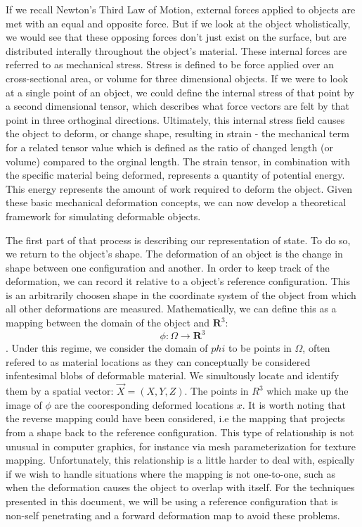 \documentclass[12pt,oneside,letterpaper]{memoir}
\begin{document}
If we recall Newton's Third Law of Motion, external forces applied to
objects are met with an equal and opposite force. But if we look at
the object wholistically, we would see that these opposing forces
don't just exist on the surface, but are distributed interally
throughout the object's material. These internal forces are referred
to as mechanical stress. Stress is defined to be force applied over an
cross-sectional area, or volume for three dimensional objects. If we
were to look at a single point of an object, we could define the
internal stress of that point by a second dimensional tensor, which
describes what force vectors are felt by that point in three
orthoginal directions. Ultimately, this internal stress field causes
the object to deform, or change shape, resulting in strain - the
mechanical term for a related tensor value which is defined as the
ratio of changed length (or volume) compared to the orginal
length. The strain tensor, in combination with the specific material
being deformed, represents a quantity of potential energy. This energy
represents the amount of work required to deform the object.  Given
these basic mechanical deformation concepts, we can now develop a
theoretical framework for simulating deformable objects.

The first part of that process is describing our representation of
state. To do so, we return to the object's shape. The deformation of
an object is the change in shape between one configuration and
another. In order to keep track of the deformation, we can record it
relative to a object's reference configuration. This is an arbitrarily
choosen shape in the coordinate system of the object from which all
other deformations are measured. Mathematically, we can define this as
a mapping between the domain of the object and $\mathbf{R}^3$:
$$\phi: \Omega \rightarrow \mathbf{R}^3$$. Under this regime, we
consider the domain of $phi$ to be points in $\Omega$, often refered
to as material locations as they can conceptually be considered
infentesimal blobs of deformable material. We simultously locate and
identify them by a spatial vector: $\vec{X} = (X, Y, Z)$. The points
in $R^3$ which make up the image of $\phi$ are the cooresponding
deformed locations $x$. It is worth noting that the reverse mapping
could have been considered, i.e the mapping that projects from a shape
back to the reference configuration. This type of relationship is
not unusual in computer graphics, for instance via mesh
parameterization for texture mapping. Unfortunately, this relationship
is a little harder to deal with, espically if we wish to handle
situations where the mapping is not one-to-one, such as when the
deformation causes the object to overlap with itself. For the
techniques presented in this document, we will be using a reference
configuration that is non-self penetrating and a forward deformation
map to avoid these problems.
\end{document}

